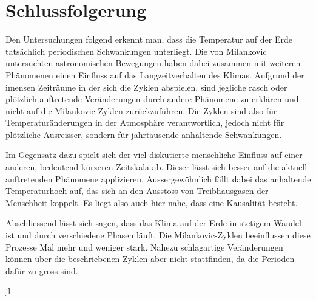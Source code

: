 %
%
%
%
\section{Schlussfolgerung
\label{milankovic:section:Schlussfolgerung}}

Den Untersuchungen folgend erkennt man, dass die Temperatur auf der Erde tatsächlich periodischen Schwankungen unterliegt.
Die von Milankovic untersuchten astronomischen Bewegungen haben dabei zusammen mit weiteren Phänomenen einen Einfluss auf das Langzeitverhalten des Klimas.
Aufgrund der imensen Zeiträume in der sich die Zyklen abspielen, sind jegliche rasch oder plötzlich auftretende Veränderungen durch andere Phänomene zu erklären und nicht auf die Milankovic-Zyklen zurückzuführen. 
Die Zyklen sind also für Temperaturänderungen in der Atmosphäre verantwortlich, jedoch nicht für plötzliche Ausreisser, sondern für jahrtausende anhaltende Schwankungen.

Im Gegensatz dazu spielt sich der viel diskutierte menschliche Einfluss auf einer anderen, bedeutend kürzeren Zeitskala ab.
Dieser lässt sich besser auf die aktuell auftretenden Phänomene applizieren.
Aussergewöhnlich fällt dabei das anhaltende Temperaturhoch auf, das sich an den Ausstoss von Treibhausgasen der Menschheit koppelt.
Es liegt also auch hier nahe, dass eine Kausalität besteht.

Abschliessend lässt sich sagen, dass das Klima auf der Erde in stetigem Wandel ist und durch verschiedene Phasen läuft.
Die Milankovic-Zyklen beeinflussen diese Prozesse Mal mehr und weniger stark.
Nahezu schlagartige Veränderungen können über die beschriebenen Zyklen aber nicht stattfinden, da die Perioden dafür zu gross sind.

jl
